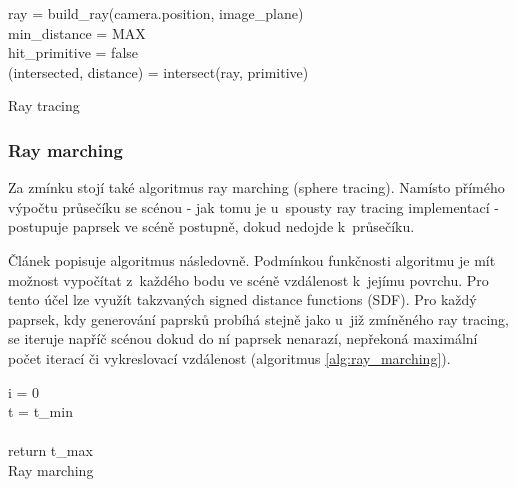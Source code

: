\begin{center}
	\begin{czechalgorithm}[H] \label{alg:rt_1}
		ray = build\_ray(camera.position, image\_plane)\\
		min\_distance = MAX\\
		hit\_primitive = false\\
		 {
			(intersected, distance) = intersect(ray, primitive)\\
		}
		\caption{Ray tracing}
	\end{czechalgorithm}
\end{center}

\subsubsection{Ray marching}
Za zmínku stojí také algoritmus ray marching (sphere tracing). Namísto přímého výpočtu průsečíku se scénou - jak tomu je u~spousty ray tracing implementací - postupuje paprsek ve scéně postupně, dokud nedojde k~průsečíku.

Článek \cite{sphere_tracing} popisuje algoritmus následovně. Podmínkou funkčnosti algoritmu je mít možnost vypočítat z~každého bodu ve scéně vzdálenost k~jejímu povrchu. Pro tento účel lze využít takzvaných signed distance functions (SDF). Pro každý paprsek, kdy generování paprsků probíhá stejně jako u~již zmíněného ray tracing, se iteruje napříč scénou dokud do ní paprsek nenarazí, nepřekoná maximální počet iterací či vykreslovací vzdálenost (algoritmus \ref{alg:ray_marching}).


\begin{center}
	\begin{czechalgorithm}[H] \label{alg:ray_marching}
		i = 0\\
		t = t\_min\\
		\\
		return t\_max\\
		\caption{Ray marching}
	\end{czechalgorithm}
\end{center}

